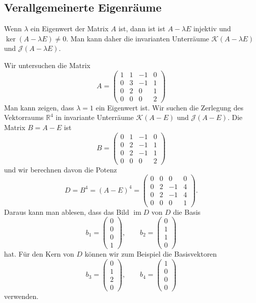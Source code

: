 %
%
\subsection{Verallgemeinerte Eigenräume
\label{buch:subsection:verallgemeinerte-eigenraeume}}
Wenn $\lambda$ ein Eigenwert der Matrix $A$ ist, dann ist
ist $A-\lambda E$ injektiv und $\ker(A-\lambda E)\ne 0$.
Man kann daher die invarianten Unterräume $\mathcal{K}(A-\lambda E)$
und $\mathcal{J}(A-\lambda E)$.

\begin{beispiel}
Wir untersuchen die Matrix
\[
A
=
\begin{pmatrix}
1&1&-1&0\\
0&3&-1&1\\
0&2& 0&1\\
0&0& 0&2
\end{pmatrix}
\]
Man kann zeigen, dass $\lambda=1$ ein Eigenwert ist.
Wir suchen die Zerlegung des Vektorraums $\mathbb{R}^4$ in invariante
Unterräume $\mathcal{K}(A-E)$ und $\mathcal{J}(A-E)$.
Die Matrix $B=A-E$ ist
\[
B
=
\begin{pmatrix}
0&1&-1&0\\
0&2&-1&1\\
0&2&-1&1\\
0&0& 0&2
\end{pmatrix}
\]
und wir berechnen davon die Potenz
\[
D=B^4=(A-E)^4
=
\begin{pmatrix}
0&0& 0&0\\
0&2&-1&4\\
0&2&-1&4\\
0&0& 0&1
\end{pmatrix}.
\]
Daraus kann man ablesen, dass das Bild $\operatorname{im}D$
von $D$ die Basis
\[
b_1
=
\begin{pmatrix}
0\\0\\0\\1
\end{pmatrix}
, \qquad
b_2
=
\begin{pmatrix}
0\\1\\1\\0
\end{pmatrix}
\]
hat.
Für den Kern von $D$ können wir zum Beispiel die Basisvektoren
\[
b_3
=
\begin{pmatrix}
0\\1\\2\\0
\end{pmatrix}
,\qquad
b_4
=
\begin{pmatrix}
1\\0\\0\\0
\end{pmatrix}
\]
verwenden.


\end{beispiel}
